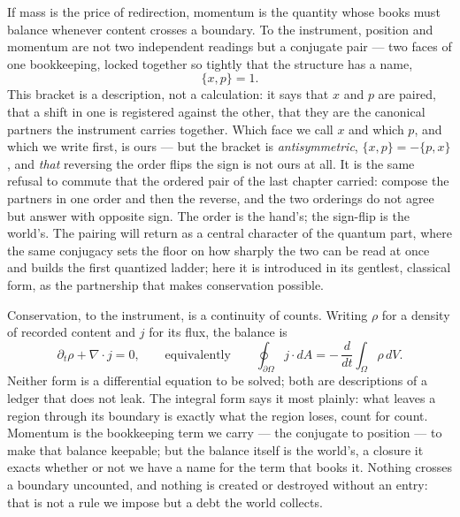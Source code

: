 If mass is the price of redirection, momentum is the quantity whose books must balance whenever content
crosses a boundary. To the instrument, position and momentum are not two independent readings but a conjugate
pair --- two faces of one bookkeeping, locked together so tightly that the structure has a name,
\begin{equation}
  \{x, p\} = 1.
\end{equation}
This bracket is a description, not a calculation: it says that $x$ and $p$ are paired, that a shift in one is
registered against the other, that they are the canonical partners the instrument carries together. Which face
we call $x$ and which $p$, and which we write first, is ours --- but the bracket is \emph{antisymmetric},
$\{x,p\} = -\{p,x\}$, and \emph{that} reversing the order flips the sign is not ours at all. It is the same
refusal to commute that the ordered pair of the last chapter carried: compose the partners in one order and
then the reverse, and the two orderings do not agree but answer with opposite sign. The order is the hand's;
the sign-flip is the world's. The pairing will return as a central character of the quantum part, where the same conjugacy
sets the floor on how sharply the two can be read at once and builds the first quantized ladder; here it is
introduced in its gentlest, classical form, as the partnership that makes conservation possible.

Conservation, to the instrument, is a continuity of counts. Writing $\rho$ for a density of recorded content
and $j$ for its flux, the balance is
\begin{equation}
  \partial_t \rho + \nabla \cdot j = 0,
  \qquad\text{equivalently}\qquad
  \oint_{\partial \Omega} j \cdot dA = -\,\frac{d}{dt}\!\int_\Omega \rho\, dV .
\end{equation}
Neither form is a differential equation to be solved; both are descriptions of a ledger that does not leak.
The integral form says it most plainly: what leaves a region through its boundary is exactly what the region
loses, count for count. Momentum is the bookkeeping term we carry --- the conjugate to position --- to make
that balance keepable; but the balance itself is the world's, a closure it exacts whether or not we have a name
for the term that books it. Nothing crosses a boundary uncounted, and nothing is created or destroyed without
an entry: that is not a rule we impose but a debt the world collects.

